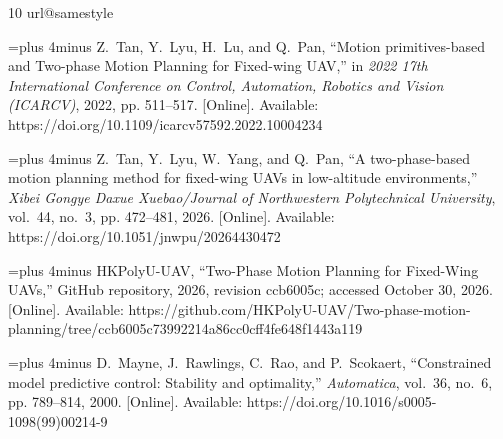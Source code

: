 \documentclass[journal]{IEEEtran}
\begin{document}
\begin{thebibliography}{10}
\providecommand{\url}[1]{#1}
\csname url@samestyle\endcsname
\providecommand{\newblock}{\relax}
\providecommand{\bibinfo}[2]{#2}
\providecommand{\BIBentrySTDinterwordspacing}{\spaceskip=0pt\relax}
\providecommand{\BIBentryALTinterwordstretchfactor}{4}
\providecommand{\BIBentryALTinterwordspacing}{\spaceskip=\fontdimen2\font plus
\BIBentryALTinterwordstretchfactor\fontdimen3\font minus
  \fontdimen4\font\relax}
\providecommand{\BIBforeignlanguage}[2]{{%
\expandafter\ifx\csname l@#1\endcsname\relax
\typeout{** WARNING: IEEEtran.bst: No hyphenation pattern has been}%
\typeout{** loaded for the language `#1'. Using the pattern for}%
\typeout{** the default language instead.}%
\else
\language=\csname l@#1\endcsname
\fi
#2}}
\providecommand{\BIBdecl}{\relax}
\BIBdecl

\BIBentryALTinterwordspacing
Z.~Tan, Y.~Lyu, H.~Lu, and Q.~Pan, ``{Motion primitives-based and Two-phase
  Motion Planning for Fixed-wing UAV},'' in \emph{2022 17th International
  Conference on Control, Automation, Robotics and Vision (ICARCV)}, 2022, pp.
  511--517. [Online]. Available:
  \url{https://doi.org/10.1109/icarcv57592.2022.10004234}
\BIBentrySTDinterwordspacing

\BIBentryALTinterwordspacing
Z.~Tan, Y.~Lyu, W.~Yang, and Q.~Pan, ``{A two-phase-based motion planning
  method for fixed-wing UAVs in low-altitude environments},'' \emph{Xibei
  Gongye Daxue Xuebao/Journal of Northwestern Polytechnical University},
  vol.~44, no.~3, pp. 472--481, 2026. [Online]. Available:
  \url{https://doi.org/10.1051/jnwpu/20264430472}
\BIBentrySTDinterwordspacing

\BIBentryALTinterwordspacing
{HKPolyU-UAV}, ``{Two-Phase Motion Planning for Fixed-Wing UAVs},'' GitHub
  repository, 2026, revision ccb6005c; accessed October 30, 2026. [Online].
  Available:
  \url{https://github.com/HKPolyU-UAV/Two-phase-motion-planning/tree/ccb6005c73992214a86cc0cff4fe648f1443a119}
\BIBentrySTDinterwordspacing

\BIBentryALTinterwordspacing
D.~Mayne, J.~Rawlings, C.~Rao, and P.~Scokaert, ``{Constrained model predictive
  control: Stability and optimality},'' \emph{Automatica}, vol.~36, no.~6, pp.
  789--814, 2000. [Online]. Available:
  \url{https://doi.org/10.1016/s0005-1098(99)00214-9}
\BIBentrySTDinterwordspacing


\end{thebibliography}
\end{document}
